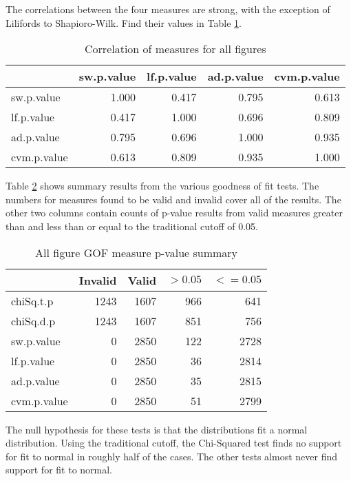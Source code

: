 The correlations between the four measures are strong, with the exception
of Lilifords to Shapioro-Wilk. Find their values in Table \ref{table:allcorr}.

\begin{table}[h!]
\centering
\begin{tabular}{l | r r r r}
& sw.p.value & lf.p.value & ad.p.value & cvm.p.value \\
 \hline
sw.p.value   & 1.000  & 0.417  & 0.795   & 0.613 \\
lf.p.value   & 0.417  & 1.000  & 0.696   & 0.809 \\
ad.p.value   & 0.795  & 0.696  & 1.000   & 0.935 \\
cvm.p.value  & 0.613  & 0.809  & 0.935   & 1.000 \\
\end{tabular}
\caption{Correlation of measures for all figures}
\label{table:allcorr}
\end{table}

Table \ref{table:allsumm} shows summary results from the various goodness
of fit tests.
The numbers for measures found to be valid and invalid cover all of the
results.
The other two columns contain counts of p-value results from valid measures
greater than and less than or equal to the traditional cutoff of 0.05.

\begin{table}[h!]
\centering
\begin{tabular}{l | r r r r}
& Invalid & Valid & $> 0.05$ & $<= 0.05$ \\
 \hline
chiSq.t.p   & 1243 & 1607 &  966 &  641 \\
chiSq.d.p   & 1243 & 1607 &  851 &  756 \\
sw.p.value  &    0 & 2850 &  122 & 2728 \\
lf.p.value  &    0 & 2850 &   36 & 2814 \\
ad.p.value  &    0 & 2850 &   35 & 2815 \\
cvm.p.value &    0 & 2850 &   51 & 2799 \\
\end{tabular}
\caption{All figure GOF measure p-value summary}
\label{table:allsumm}
\end{table}

The null hypothesis for these tests is that the distributions fit a normal
distribution. Using the traditional cutoff,
the Chi-Squared test finds no support for fit to normal in roughly half
of the cases.
The other tests almost never find support for fit to normal.

